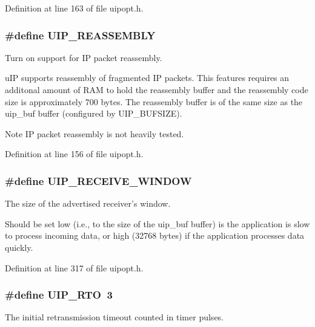 Definition at line 163 of file uipopt.h.

\hypertarget{group__uipopt_gaf963fdea2b75d27ef31e92d1d01359ee}{
\subsubsection[{UIP\_\-REASSEMBLY}]{\setlength{\rightskip}{0pt plus 5cm}\#define UIP\_\-REASSEMBLY}}
\label{group__uipopt_gaf963fdea2b75d27ef31e92d1d01359ee}
Turn on support for IP packet reassembly.

uIP supports reassembly of fragmented IP packets. This features requires an additonal amount of RAM to hold the reassembly buffer and the reassembly code size is approximately 700 bytes. The reassembly buffer is of the same size as the uip\_\-buf buffer (configured by UIP\_\-BUFSIZE).

\begin{DoxyNote}{Note}
IP packet reassembly is not heavily tested. 
\end{DoxyNote}


Definition at line 156 of file uipopt.h.

\hypertarget{group__uipopt_ga5b9dba2123705bce1ce95c3deca0bdad}{
\subsubsection[{UIP\_\-RECEIVE\_\-WINDOW}]{\setlength{\rightskip}{0pt plus 5cm}\#define UIP\_\-RECEIVE\_\-WINDOW}}
\label{group__uipopt_ga5b9dba2123705bce1ce95c3deca0bdad}
The size of the advertised receiver's window.

Should be set low (i.e., to the size of the uip\_\-buf buffer) is the application is slow to process incoming data, or high (32768 bytes) if the application processes data quickly. 

Definition at line 317 of file uipopt.h.

\hypertarget{group__uipopt_ga15de27b044603284f68db05a378235a7}{
\subsubsection[{UIP\_\-RTO}]{\setlength{\rightskip}{0pt plus 5cm}\#define UIP\_\-RTO~3}}
\label{group__uipopt_ga15de27b044603284f68db05a378235a7}
The initial retransmission timeout counted in timer pulses.

